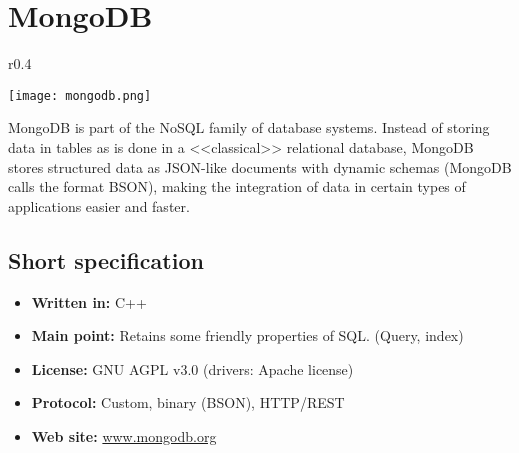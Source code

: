 \chapter{MongoDB}

\begin{wrapfigure}{r}{0.4\textwidth}
  \vspace{-42pt}
  \begin{center}
    \texttt{[image: mongodb.png]}
  \end{center}
  \vspace{-20pt}
\end{wrapfigure}
MongoDB is part of the NoSQL family of database systems. Instead of storing data in tables as is done in a <<classical>> relational database, MongoDB stores structured data as JSON-like documents with dynamic schemas (MongoDB calls the format BSON), making the integration of data in certain types of applications easier and faster.

\section{Short specification}

\begin{itemize}
  \item \textbf{Written in:} C++
  \item \textbf{Main point:} Retains some friendly properties of SQL. (Query, index)
  \item \textbf{License:} GNU AGPL v3.0 (drivers: Apache license)
  \item \textbf{Protocol:} Custom, binary (BSON), HTTP/REST
  \item \textbf{Web site:} \href{http://www.mongodb.org/}{www.mongodb.org}
\end{itemize}